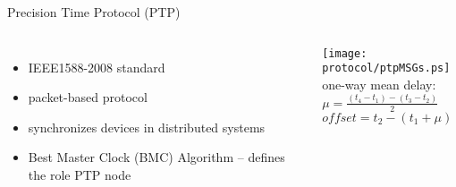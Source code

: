 \documentclass[compress,red]{beamer}
\begin{document}
\begin{frame}{Precision Time Protocol (PTP)}
\begin{columns}[c]
\column{2.8in}

  \begin{itemize}
    \item IEEE1588-2008 standard
    \item packet-based protocol 
    \item synchronizes devices in distributed systems
    \item Best Master Clock (BMC) Algorithm -- defines the role PTP node 
  \end{itemize}

\column{1.5in}
    \texttt{[image: protocol/ptpMSGs.ps]} \\
    \small 
    one-way mean delay: \\
    $\mu = \frac{(t_{4}-t_{1}) - (t_{3}-t_{2})}{2}$ \\
    \small 
    $offset = t_{2} - (t_{1} + \mu)$
    
\end{columns}


\end{frame}
\end{document}
